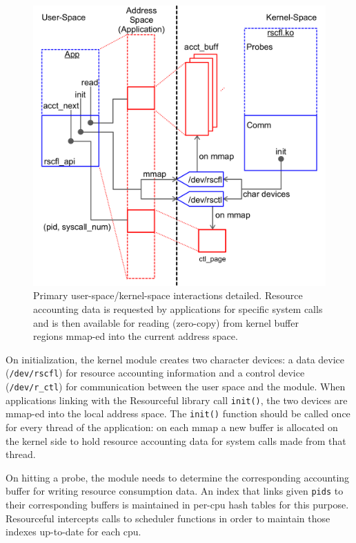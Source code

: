 \documentclass[letterpaper,twocolumn,10pt]{article}
\newcommand{\pname}{Resourceful}
\begin{document}
\begin{figure}[ht!] 
	\centering 
	\includegraphics[width=1.1\columnwidth]{sys_design}
	\caption{Primary user-space/kernel-space interactions detailed. Resource
accounting data is requested by applications for specific system calls and is
then available for reading (zero-copy) from kernel buffer regions mmap-ed into
the current address space. } 
	\label{fig:design}
\end{figure}

On initialization, the kernel module creates two character devices: a data
device (\texttt{/dev/rscfl}) for resource accounting information and a control
device (\texttt{/dev/r\_ctl}) for communication between the user space and the module. When
applications linking with the \pname{ }library call \texttt{init()}, the two
devices are mmap-ed into the local address space. The \texttt{init()} function should be
called once for every thread of the application: on each mmap a new buffer is allocated
on the kernel side to hold resource accounting data for system calls made from that thread.

On hitting a probe, the module needs to determine the corresponding accounting
buffer for writing resource consumption data. An index that links given \texttt{pids} to
their corresponding buffers is maintained in per-cpu hash tables for this
purpose. \pname{ } intercepts calls to scheduler functions in order to maintain
those indexes up-to-date for each cpu.
\end{document}
